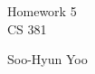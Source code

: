 \documentclass[letterpaper,10pt]{article}
\begin{document}
\begin{titlepage}
	\vspace*{4cm}
	\begin{flushright}
		{\huge
			Homework 5 \\ [1cm]
		}
		{\large
			CS 381 \\ [3cm]
		}

		Soo-Hyun Yoo
	\end{flushright}
\end{titlepage}

\newpage


\end{document}
